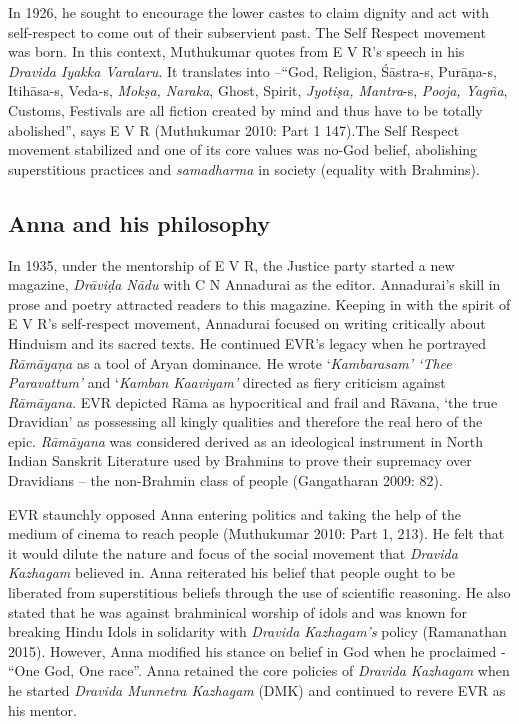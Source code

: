 In 1926, he sought to encourage the lower castes to claim dignity and act with self-respect to come out of their subservient past. The Self Respect movement was born. In this context, Muthukumar quotes from E V R’s speech in his \textit{Dravida Iyakka Varalaru}. It translates into –“God, Religion, Śāstra-s, Purāņa-s, Itihāsa-s, Veda-s, \textit{Mokṣa, Naraka}, Ghost, Spirit, \textit{Jyotiṣa, Mantra}-s,\textit{ Pooja, Yagña}, Customs, Festivals are all fiction created by mind and thus have to be totally abolished”, says E V R (Muthukumar 2010: Part 1 147).The Self Respect movement stabilized and one of its core values was no-God belief, abolishing superstitious practices and \textit{samadharma} in society (equality with Brahmins).


\subsection*{Anna and his philosophy}

In 1935, under the mentorship of E V R, the Justice party started a new magazine, \textit{Drāviḍa Nādu} with C N Annadurai as the editor. Annadurai’s skill in prose and poetry attracted readers to this magazine. Keeping in with the spirit of E V R’s self-respect movement, Annadurai focused on writing critically about Hinduism and its sacred texts. He continued EVR’s legacy when he portrayed \textit{Rāmāyaņa} as a tool of Aryan dominance. He wrote ‘\textit{Kambarasam’ ‘Thee Paravattum’} and ‘\textit{Kamban Kaaviyam’} directed as fiery criticism against \textit{Rāmāyana}. EVR depicted Rāma as hypocritical and frail and Rāvana, ‘the true Dravidian’ as possessing all kingly qualities and therefore the real hero of the epic. \textit{Rāmāyana }was considered derived as an ideological instrument in North Indian Sanskrit Literature used by Brahmins to prove their supremacy over Dravidians – the non-Brahmin class of people (Gangatharan 2009: 82).

EVR staunchly opposed Anna entering politics and taking the help of the medium of cinema to reach people (Muthukumar 2010: Part 1, 213). He felt that it would dilute the nature and focus of the social movement that \textit{Dravida Kazhagam} believed in. Anna reiterated his belief that people ought to be liberated from superstitious beliefs through the use of scientific reasoning. He also stated that he was against brahminical worship of idols and was known for breaking Hindu Idols in solidarity with \textit{Dravida Kazhagam’s} policy (Ramanathan 2015). However, Anna modified his stance on belief in God when he proclaimed - “One God, One race”. Anna retained the core policies of \textit{Dravida Kazhagam} when he started \textit{Dravida Munnetra Kazhagam} (DMK) and continued to revere EVR as his mentor.


